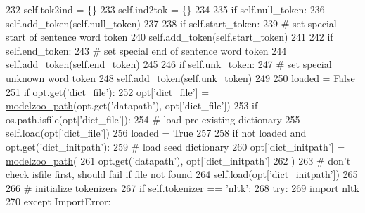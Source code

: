 \begin{DoxyCode}
232             self.tok2ind = \{\}
233             self.ind2tok = \{\}
234 
235             \textcolor{keywordflow}{if} self.null\_token:
236                 self.add\_token(self.null\_token)
237 
238             \textcolor{keywordflow}{if} self.start\_token:
239                 \textcolor{comment}{# set special start of sentence word token}
240                 self.add\_token(self.start\_token)
241 
242             \textcolor{keywordflow}{if} self.end\_token:
243                 \textcolor{comment}{# set special end of sentence word token}
244                 self.add\_token(self.end\_token)
245 
246             \textcolor{keywordflow}{if} self.unk\_token:
247                 \textcolor{comment}{# set special unknown word token}
248                 self.add\_token(self.unk\_token)
249 
250             loaded = \textcolor{keyword}{False}
251             \textcolor{keywordflow}{if} opt.get(\textcolor{stringliteral}{'dict\_file'}):
252                 opt[\textcolor{stringliteral}{'dict\_file'}] = \hyperlink{namespaceparlai_1_1agents_1_1legacy__agents_1_1seq2seq_1_1utils__v0_a5fbd3301b67f00d6d146fb01c7cd7626}{modelzoo\_path}(opt.get(\textcolor{stringliteral}{'datapath'}), opt[\textcolor{stringliteral}{'dict\_file'}])
253                 \textcolor{keywordflow}{if} os.path.isfile(opt[\textcolor{stringliteral}{'dict\_file'}]):
254                     \textcolor{comment}{# load pre-existing dictionary}
255                     self.load(opt[\textcolor{stringliteral}{'dict\_file'}])
256                     loaded = \textcolor{keyword}{True}
257 
258             \textcolor{keywordflow}{if} \textcolor{keywordflow}{not} loaded \textcolor{keywordflow}{and} opt.get(\textcolor{stringliteral}{'dict\_initpath'}):
259                 \textcolor{comment}{# load seed dictionary}
260                 opt[\textcolor{stringliteral}{'dict\_initpath'}] = \hyperlink{namespaceparlai_1_1agents_1_1legacy__agents_1_1seq2seq_1_1utils__v0_a5fbd3301b67f00d6d146fb01c7cd7626}{modelzoo\_path}(
261                     opt.get(\textcolor{stringliteral}{'datapath'}), opt[\textcolor{stringliteral}{'dict\_initpath'}]
262                 )
263                 \textcolor{comment}{# don't check isfile first, should fail if file not found}
264                 self.load(opt[\textcolor{stringliteral}{'dict\_initpath'}])
265 
266         \textcolor{comment}{# initialize tokenizers}
267         \textcolor{keywordflow}{if} self.tokenizer == \textcolor{stringliteral}{'nltk'}:
268             \textcolor{keywordflow}{try}:
269                 \textcolor{keyword}{import} nltk
270             \textcolor{keywordflow}{except} ImportError:

\end{DoxyCode}

